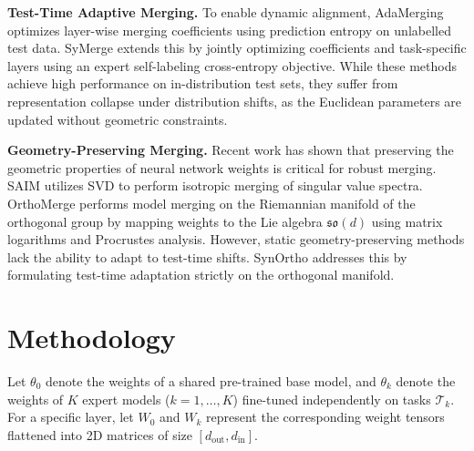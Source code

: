 \documentclass{article}
\theoremstyle{plain}
\theoremstyle{definition}
\theoremstyle{remark}
\begin{document}
\textbf{Test-Time Adaptive Merging.} To enable dynamic alignment, AdaMerging \cite{yang2024adamerging} optimizes layer-wise merging coefficients using prediction entropy on unlabelled test data. SyMerge \cite{symerge2025symerge} extends this by jointly optimizing coefficients and task-specific layers using an expert self-labeling cross-entropy objective. While these methods achieve high performance on in-distribution test sets, they suffer from representation collapse under distribution shifts, as the Euclidean parameters are updated without geometric constraints.

\textbf{Geometry-Preserving Merging.} Recent work has shown that preserving the geometric properties of neural network weights is critical for robust merging. SAIM \cite{saim2026merge} utilizes SVD to perform isotropic merging of singular value spectra. OrthoMerge \cite{orthomerge2026orthogonal} performs model merging on the Riemannian manifold of the orthogonal group by mapping weights to the Lie algebra $\mathfrak{so}(d)$ using matrix logarithms and Procrustes analysis. However, static geometry-preserving methods lack the ability to adapt to test-time shifts. SynOrtho addresses this by formulating test-time adaptation strictly on the orthogonal manifold.

\section{Methodology}
\label{submission-methodology}

Let $\theta_0$ denote the weights of a shared pre-trained base model, and $\theta_k$ denote the weights of $K$ expert models ($k = 1, \dots, K$) fine-tuned independently on tasks $\mathcal{T}_k$. For a specific layer, let $W_0$ and $W_k$ represent the corresponding weight tensors flattened into 2D matrices of size $[d_{\text{out}}, d_{\text{in}}]$.
\end{document}
